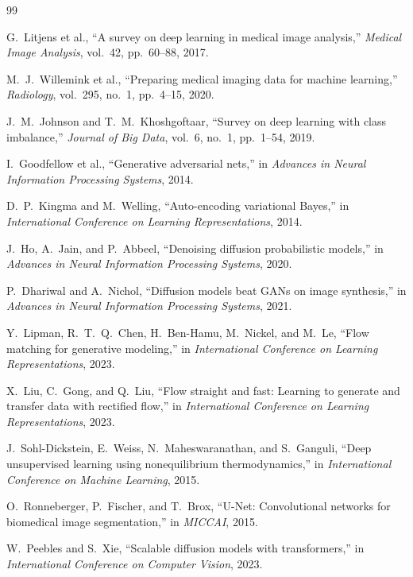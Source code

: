 \documentclass[twocolumn]{article}
\begin{document}

\begin{thebibliography}{99}

G.~Litjens et al., ``A survey on deep learning in medical image analysis,'' \textit{Medical Image Analysis}, vol.~42, pp.~60--88, 2017.

M.~J.~Willemink et al., ``Preparing medical imaging data for machine learning,'' \textit{Radiology}, vol.~295, no.~1, pp.~4--15, 2020.

J.~M.~Johnson and T.~M.~Khoshgoftaar, ``Survey on deep learning with class imbalance,'' \textit{Journal of Big Data}, vol.~6, no.~1, pp.~1--54, 2019.

I.~Goodfellow et al., ``Generative adversarial nets,'' in \textit{Advances in Neural Information Processing Systems}, 2014.

D.~P.~Kingma and M.~Welling, ``Auto-encoding variational Bayes,'' in \textit{International Conference on Learning Representations}, 2014.

J.~Ho, A.~Jain, and P.~Abbeel, ``Denoising diffusion probabilistic models,'' in \textit{Advances in Neural Information Processing Systems}, 2020.

P.~Dhariwal and A.~Nichol, ``Diffusion models beat GANs on image synthesis,'' in \textit{Advances in Neural Information Processing Systems}, 2021.

Y.~Lipman, R.~T.~Q.~Chen, H.~Ben-Hamu, M.~Nickel, and M.~Le, ``Flow matching for generative modeling,'' in \textit{International Conference on Learning Representations}, 2023.

X.~Liu, C.~Gong, and Q.~Liu, ``Flow straight and fast: Learning to generate and transfer data with rectified flow,'' in \textit{International Conference on Learning Representations}, 2023.

J.~Sohl-Dickstein, E.~Weiss, N.~Maheswaranathan, and S.~Ganguli, ``Deep unsupervised learning using nonequilibrium thermodynamics,'' in \textit{International Conference on Machine Learning}, 2015.

O.~Ronneberger, P.~Fischer, and T.~Brox, ``U-Net: Convolutional networks for biomedical image segmentation,'' in \textit{MICCAI}, 2015.

W.~Peebles and S.~Xie, ``Scalable diffusion models with transformers,'' in \textit{International Conference on Computer Vision}, 2023.


\end{thebibliography}
\end{document}
